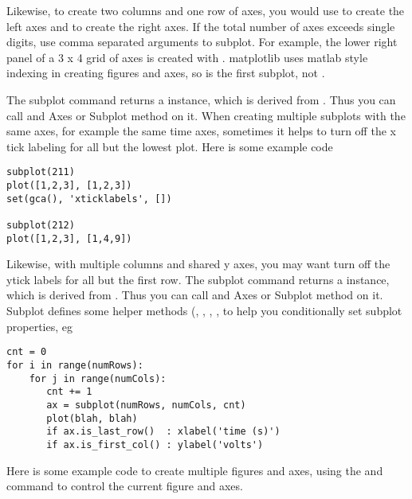\documentclass[twoside]{book}
\begin{document}



\noindent Likewise, to create two columns and one row of axes, you would use
 to create the left axes and  to
create the right axes.  If the total number of axes exceeds single
digits, use comma separated arguments to subplot.  For example, the
lower right panel of a 3 x 4 grid of axes is created with
.  matplotlib uses matlab style indexing in
creating figures and axes, so  is the first
subplot, not .


The subplot command returns a 
instance, which is derived from .  Thus
you can call and Axes or Subplot method on it.  When creating multiple
subplots with the same axes, for example the same time axes, sometimes
it helps to turn off the x tick labeling for all but the lowest plot.
Here is some example code

\begin{lstlisting}
subplot(211)
plot([1,2,3], [1,2,3])
set(gca(), 'xticklabels', [])

subplot(212)
plot([1,2,3], [1,4,9])
\end{lstlisting}


Likewise, with multiple columns and shared y axes, you may want turn
off the ytick labels for all but the first row.  The subplot command
returns a  instance, which is derived
from .  Thus you can call and Axes or
Subplot method on it.  Subplot defines some helper methods
(, , ,
, to help you conditionally set subplot properties,
eg

\begin{lstlisting}
cnt = 0
for i in range(numRows):
    for j in range(numCols):
       cnt += 1
       ax = subplot(numRows, numCols, cnt)
       plot(blah, blah)
       if ax.is_last_row()  : xlabel('time (s)')
       if ax.is_first_col() : ylabel('volts')
\end{lstlisting}


Here is some example code to create multiple figures and axes, using
the  and  command to control the current
figure and axes.


\end{document}
